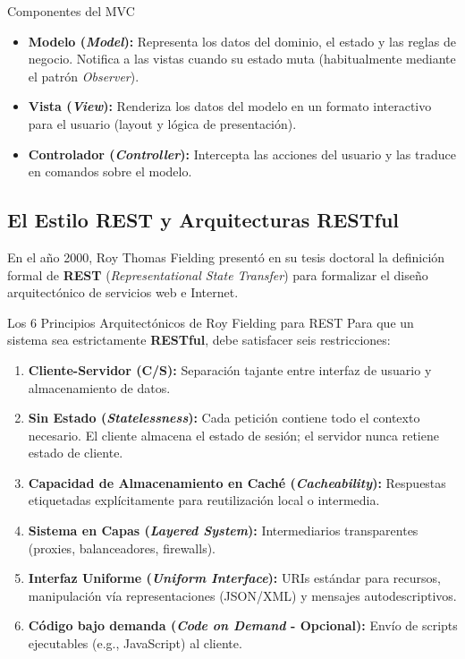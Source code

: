 \begin{definicion}{Componentes del MVC}
\begin{itemize}[leftmargin=1.5em]
  \item \textbf{Modelo (\emph{Model}):} Representa los datos del dominio, el estado y las reglas de negocio. Notifica a las vistas cuando su estado muta (habitualmente mediante el patrón \emph{Observer}).
  \item \textbf{Vista (\emph{View}):} Renderiza los datos del modelo en un formato interactivo para el usuario (layout y lógica de presentación).
  \item \textbf{Controlador (\emph{Controller}):} Intercepta las acciones del usuario y las traduce en comandos sobre el modelo.
\end{itemize}
\end{definicion}

\subsection{El Estilo REST y Arquitecturas RESTful}

En el año 2000, Roy Thomas Fielding presentó en su tesis doctoral la definición formal de \textbf{REST} (\emph{Representational State Transfer}) para formalizar el diseño arquitectónico de servicios web e Internet.

\begin{principio}{Los 6 Principios Arquitectónicos de Roy Fielding para REST}
Para que un sistema sea estrictamente \textbf{RESTful}, debe satisfacer seis restricciones:
\begin{enumerate}[leftmargin=1.5em]
  \item \textbf{Cliente-Servidor (C/S):} Separación tajante entre interfaz de usuario y almacenamiento de datos.
  \item \textbf{Sin Estado (\emph{Statelessness}):} Cada petición contiene todo el contexto necesario. El cliente almacena el estado de sesión; el servidor nunca retiene estado de cliente.
  \item \textbf{Capacidad de Almacenamiento en Caché (\emph{Cacheability}):} Respuestas etiquetadas explícitamente para reutilización local o intermedia.
  \item \textbf{Sistema en Capas (\emph{Layered System}):} Intermediarios transparentes (proxies, balanceadores, firewalls).
  \item \textbf{Interfaz Uniforme (\emph{Uniform Interface}):} URIs estándar para recursos, manipulación vía representaciones (JSON/XML) y mensajes autodescriptivos.
  \item \textbf{Código bajo demanda (\emph{Code on Demand} - Opcional):} Envío de scripts ejecutables (e.g., JavaScript) al cliente.
\end{enumerate}
\end{principio}

